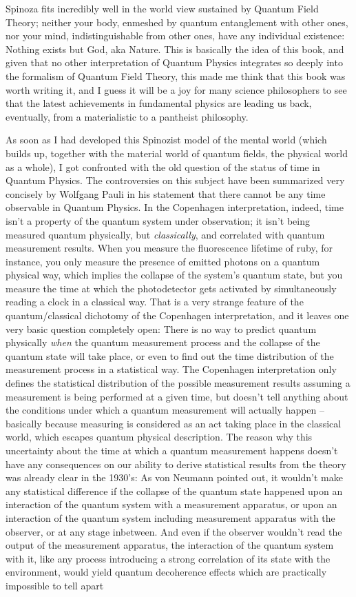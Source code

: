 Spinoza fits incredibly well in the world view sustained by Quantum Field Theory; neither your body, enmeshed by quantum entanglement with other ones, nor your mind, indistinguishable from other ones, have any individual existence: Nothing exists but God, aka Nature. This is basically the idea of this book, and given that no other interpretation of Quantum Physics integrates so deeply into the formalism of Quantum Field Theory, this made me think that this book was worth writing it, and I guess it will be a joy for many science philosophers to see that the latest achievements in fundamental physics are leading us back, eventually, from a materialistic to a pantheist philosophy.

As soon as I had developed this Spinozist model of the mental world (which builds up, together with the material world of quantum fields, the physical world as a whole), I got confronted with the old question of the status of time in Quantum Physics. The controversies on this subject have been summarized very concisely by Wolfgang Pauli in his statement that there cannot be any time observable in Quantum Physics. In the Copenhagen interpretation, indeed, time isn't a property of the quantum system under observation; it isn't being measured quantum physically, but \textit{classically}, and correlated with quantum measurement results. When you measure the fluorescence lifetime of ruby, for instance, you only measure the presence of emitted photons on a quantum physical way, which implies the collapse of the system's quantum state, but you measure the time at which the photodetector gets activated by simultaneously reading a clock in a classical way. That is a very strange feature of the quantum/classical dichotomy of the Copenhagen interpretation, and it leaves one very basic question completely open: There is no way to predict quantum physically \textit{when} the quantum measurement process and the collapse of the quantum state will take place, or even to find out the time distribution of the measurement process in a statistical way. The Copenhagen interpretation only defines the statistical distribution of the possible measurement results assuming a measurement is being performed at a given time, but doesn't tell anything about the conditions under which a quantum measurement will actually happen -- basically because measuring is considered as an act taking place in the classical world, which escapes quantum physical description. The reason why this uncertainty about the time at which a quantum measurement happens doesn't have any consequences on our ability to derive statistical results from the theory was already clear in the 1930's: As von Neumann pointed out, it wouldn't make any statistical difference if the collapse of the quantum state happened upon an interaction of the quantum system with a measurement apparatus, or upon an interaction of the quantum system including measurement apparatus with the observer, or at any stage inbetween. And even if the observer wouldn't read the output of the measurement apparatus, the interaction of the quantum system with it, like any process introducing a strong correlation of its state with the environment, would yield quantum decoherence effects which are practically impossible to tell apart 
